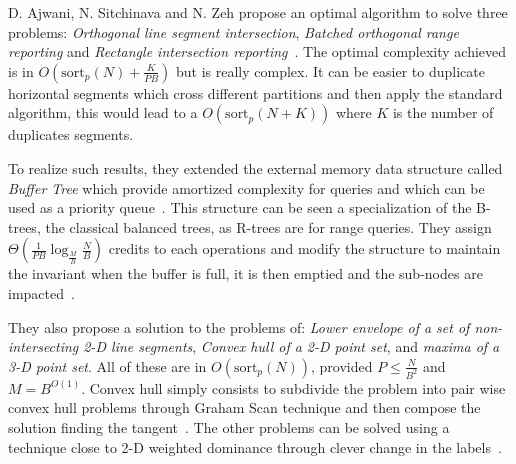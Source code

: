 D. Ajwani, N. Sitchinava and N. Zeh propose an optimal algorithm to solve three problems: \textit{Orthogonal line segment intersection}, \textit{Batched orthogonal range reporting} and \textit{Rectangle intersection reporting}~\cite{ajwani2011optimal}. The optimal complexity achieved is in $O(\text{sort}_{p}(N) + \frac{K}{PB})$ but is really complex. It can be easier to duplicate horizontal segments which cross different partitions and then apply the standard algorithm, this would lead to a $O(\text{sort}_{p}(N + K))$ where $K$ is the number of duplicates segments.

To realize such results, they extended the external memory data structure called \textit{Buffer Tree} which provide amortized complexity for queries and which can be used as a priority queue~\cite{arge2003buffer}. This structure can be seen a specialization of the B-trees, the classical balanced trees, as R-trees are for range queries. They assign $\Theta(\frac{1}{PB} \log_{\frac{M}{B}} \frac{N}{B})$ credits to each operations and modify the structure to maintain the invariant when the buffer is full, it is then emptied and the sub-nodes are impacted~\cite{sitchinava2012parallel}.

They also propose a solution to the problems of: \textit{Lower envelope of a set of non-intersecting 2-D line segments}, \textit{Convex hull of a 2-D point set}, and \textit{maxima of a 3-D point set}. All of these are in $O(\text{sort}_{p} (N))$, provided $P \leq \frac{N}{B^{2}}$ and $M = B^{O(1)}$. Convex hull simply consists to subdivide the problem into pair wise convex hull problems through Graham Scan technique and then compose the solution finding the tangent~\cite{atallah1988parallel}. The other problems can be solved using a technique close to 2-D weighted dominance through clever change in the labels~\cite{atallah1986efficient}.
